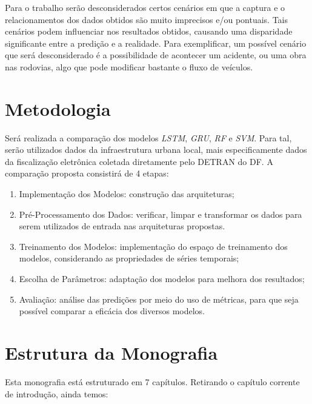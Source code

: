 Para o trabalho serão desconsiderados certos cenários em que a captura e o relacionamentos dos dados obtidos são muito imprecisos e/ou pontuais. Tais cenários podem influenciar nos resultados obtidos, causando uma disparidade significante entre a predição e a realidade. Para exemplificar, um possível cenário que será desconsiderado é a possibilidade de acontecer um acidente, ou uma obra nas rodovias, algo que pode modificar bastante o fluxo de veículos.

\section{Metodologia}

Será realizada a comparação dos modelos  \textit{\acrfull{LSTM}}, \textit{\acrfull{GRU}}, \textit{\acrfull{RF}} e \textit{\acrfull{SVM}}. Para tal, serão utilizados dados da infraestrutura urbana local, mais especificamente dados da fiscalização eletrônica coletada diretamente pelo \acrfull{DETRAN} do \acrfull{DF}. A comparação proposta consistirá de 4 etapas:

\begin{enumerate}
    \item Implementação dos Modelos: construção das arquiteturas;
    \item Pré-Processamento dos Dados: verificar, limpar e transformar os dados para serem utilizados de entrada nas arquiteturas propostas.
    \item Treinamento dos Modelos: implementação do espaço de treinamento dos modelos, considerando as propriedades de séries temporais;
    \item Escolha de Parâmetros: adaptação dos modelos para melhora dos resultados;
    \item Avaliação: análise das predições por meio do uso de métricas, para que seja possível comparar a eficácia dos diversos modelos.
\end{enumerate}

\section{Estrutura da Monografia}

Esta monografia está estruturado em 7 capítulos. Retirando o capítulo corrente de introdução, ainda temos:

